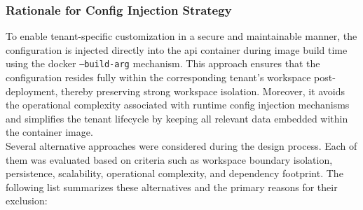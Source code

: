 \documentclass[11pt, a4paper, oneside, listof=totoc]{scrartcl}
\begin{document}
            \subsubsection{Rationale for Config Injection Strategy}\label{subsubsec:rationale}
                To enable tenant-specific customization in a secure and maintainable manner, the
                configuration is injected directly into the \gls{api} container during image build
                time using the \gls{docker} \texttt{--build-arg} mechanism.
                This approach ensures that the configuration resides fully within the corresponding
                tenant's workspace post-deployment, thereby preserving strong workspace isolation.
                Moreover, it avoids the operational complexity associated with runtime config
                injection mechanisms and simplifies the tenant lifecycle by keeping all relevant
                data embedded within the container image.
                \\
                Several alternative approaches were considered during the design process.
                Each of them was evaluated based on criteria such as workspace boundary isolation,
                persistence, scalability, operational complexity, and dependency footprint.
                The following list summarizes these alternatives and the primary reasons for their
                exclusion:
\end{document}
